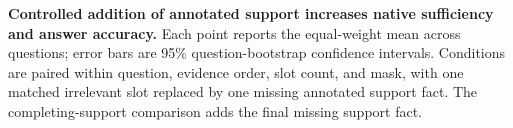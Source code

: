 \textbf{Controlled addition of annotated support increases native sufficiency and answer accuracy.} Each point reports the equal-weight mean across questions; error bars are 95\% question-bootstrap confidence intervals. Conditions are paired within question, evidence order, slot count, and mask, with one matched irrelevant slot replaced by one missing annotated support fact. The completing-support comparison adds the final missing support fact.
